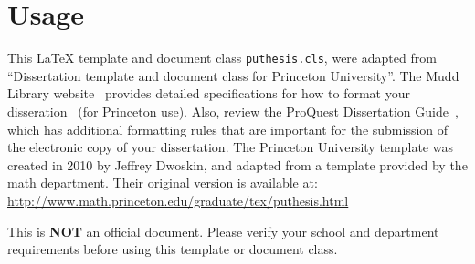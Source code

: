 \chapter{Usage\label{ch:usage}}

This \LaTeX{} template and document class \texttt{puthesis.cls}, were adapted from ``Dissertation template and document class for Princeton University''. The Mudd Library website~\cite{mudd2009} provides detailed specifications for how to format your disseration~\cite{muddthesis2009} (for Princeton use). Also, review the ProQuest Dissertation Guide~\cite{proquest2006}, which has additional formatting rules that are important for the submission of the electronic copy of your dissertation. The Princeton University template was created in 2010 by Jeffrey Dwoskin, and adapted from a template provided by the math department. Their original version is available at: \url{http://www.math.princeton.edu/graduate/tex/puthesis.html}

This is \textbf{NOT} an official document. Please verify your school and department requirements before using this template or document class.






